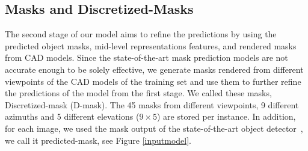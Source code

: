 \documentclass[letterpaper, 10 pt, conference]{ieeeconf}  \pdfoutput=1
\begin{document}
\subsection{Masks and Discretized-Masks}
\label{dmask}
The second stage of our model aims to refine the predictions by using the predicted 
object masks, mid-level representations features, and rendered masks from CAD models.  
Since the state-of-the-art mask prediction models \cite{He2020MaskR,Nie2020Total3DUnderstandingJL} are not accurate enough to be solely effective, we generate masks rendered from different viewpoints of the CAD models of the training set and use them to further refine the predictions of the model from the first stage. We called these masks, Discretized-mask (D-mask). The 45 masks from different viewpoints, 9 different azimuths and 5 different elevations ($9 \times 5$) are stored per instance. In addition, for each image, we used the mask output of the state-of-the-art object detector~\cite{Gkioxari2019MeshR}, we call it predicted-mask, see Figure \ref{inputmodel}.
\end{document}
